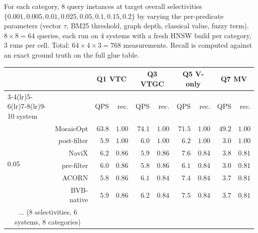 \documentclass[sigconf,nonacm,review]{acmart}
\theoremstyle{plain}
\theoremstyle{definition}
\theoremstyle{remark}
\begin{document}
\noindent For each category, $8$ query instances at target
overall selectivities
$\{0.001, 0.005, 0.01, 0.025, 0.05, 0.1, 0.15, 0.2\}$
by varying the per-predicate parameters (vector $\tau$, BM25
threshold, graph depth, classical value, fuzzy term).
$8 \times 8 = 64$ queries, each run on $4$ systems with a fresh
HNSW build per category, $3$ runs per cell.  Total: $64 \times 4
\times 3 = 768$ measurements.  Recall is computed against an
exact ground truth on the full glue table.

\begin{center}
\begin{tabular}{l rrr rrr rrr}
\toprule
& & \multicolumn{2}{c}{Q1 VTC} & \multicolumn{2}{c}{Q3 VTGC}
& \multicolumn{2}{c}{Q5 V-only} & \multicolumn{2}{c}{Q7 MV} \\
\cmidrule(lr){3-4}\cmidrule(lr){5-6}\cmidrule(lr){7-8}\cmidrule(lr){9-10}
system & & QPS & rec. & QPS & rec. & QPS & rec. & QPS & rec. \\
\midrule
\multirow{6}{*}{0.05}
  & MosaicOpt  & $63.8$ & $1.00$ & $74.1$ & $1.00$
                & $71.5$ & $1.00$ & $49.2$ & $1.00$ \\
  & post-filter & $5.9$  & $1.00$ & $6.0$  & $1.00$
                & $6.2$  & $1.00$ & $3.0$  & $1.00$ \\
  & NaviX      & $6.2$  & $0.86$ & $5.9$  & $0.86$
                & $7.6$  & $0.84$ & $3.8$  & $0.81$ \\
  & pre-filter  & $6.0$  & $0.86$ & $5.8$  & $0.86$
                & $6.1$  & $0.84$ & $3.0$  & $0.81$ \\
  & ACORN      & $5.8$  & $0.86$ & $6.1$  & $0.84$
                & $7.4$  & $0.84$ & $3.7$  & $0.81$ \\
  & BVB-native & $5.9$  & $0.86$ & $6.2$  & $0.84$
                & $7.5$  & $0.84$ & $3.7$  & $0.81$ \\
\midrule
\multicolumn{2}{c}{... (8 selectivities, 6 systems, 8 categories)}
& \multicolumn{8}{c}{} \\
\bottomrule
\end{tabular}
\end{center}
\end{document}
